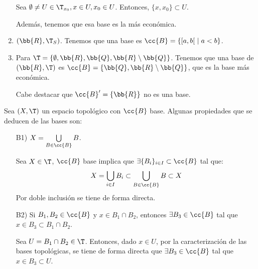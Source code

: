 \begin{ejemplo}
\begin{enumerate}
        Sea $\emptyset\neq U\in \T_{x_0}, x\in U, x_0\in U$. Entonces, $\{x,x_0\}\subset U$.

        Además, tenemos que esa base es la más económica.

        \item $(\bb{R},\T_{S})$. Tenemos que una base es $\cc{B}=\{[a,b[~\mid a<b\}$.

        \item Para $\T=\{\emptyset, \bb{R}, \bb{Q}, \bb{R}\setminus \bb{Q}\}$. Tenemos que una base de $(\bb{R}, \T)$ es $\cc{B}=\{\bb{Q}, \bb{R}\setminus \bb{Q}\}$, que es la base más económica.

        Cabe destacar que $\cc{B}'=\{\bb{R}\}$ no es una base.
    \end{enumerate}
\end{ejemplo}

Sea $(X,\T)$ un espacio topológico con $\cc{B}$ base. Algunas propiedades que se deducen de las bases son:
\begin{enumerate}
    \item[B1)] $X=\bigcup\limits_{B\in \cc{B}} B$.

    Sea $X\in \T$, $\cc{B}$ base implica que $\exists \{B_i\}_{i\in I}\subset \cc{B}$ tal que:
    \begin{equation*}
        X=\bigcup_{i\in I}B_i \subset \bigcup_{B\in \cc{B}}B \subset X
    \end{equation*}
    Por doble inclusión se tiene de forma directa.
    
    \item[B2)] Si $B_1, B_2\in \cc{B}$ y $x\in B_1\cap B_2$, entonces $\exists B_3\in \cc{B}$ tal que $x\in B_3\subset B_1\cap B_2$.

    Sea $U=B_1\cap B_2\in \T$. Entonces, dado $x\in U$, por la caracterización de las bases topológicas, se tiene de forma directa que $\exists B_3\in \cc{B}$ tal que $x\in B_3\subset U$.
\end{enumerate}

